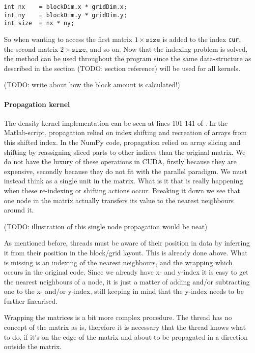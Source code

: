\begin{verbatim}
int nx    = blockDim.x * gridDim.x;
int ny    = blockDim.y * gridDim.y;
int size  = nx * ny;
\end{verbatim}

So when wanting to access the first matrix $1 \times \mathrm{\texttt{size}}$ is added to the index \texttt{cur}, the second matrix $2 \times \mathrm{\texttt{size}}$, and so on. Now that the indexing problem is solved, the method can be used throughout the program since the same data-structure as described in the section (TODO: section reference) will be used for all kernels.

(TODO: write about how the block amount is calculated!)


\paragraph{Propagation kernel} The density kernel implementation can be seen at lines 101-141 of . In the Matlab-script, propagation relied on index shifting and recreation of arrays from this shifted index. In the NumPy code, propagation relied on array slicing and shifting by reassigning sliced parts to other indices than the original matrix. We do not have the luxury of these operations in CUDA, firstly because they are expensive, secondly because they do not fit with the parallel paradigm. We must instead think as a single unit in the matrix. What is it that is really happening when these re-indexing or shifting actions occur. Breaking it down we see that one node in the matrix actually transfers its value to the nearest neighbours around it.

(TODO: illustration of this single node propagation would be neat)

As mentioned before, threads must be aware of their position in data by inferring it from their position in the block/grid layout. This is already done above. What is missing is an indexing of the nearest neighbours, and the wrapping which occurs in the original code. Since we already have x- and y-index it is easy to get the nearest neighbours of a node, it is just a matter of adding and/or subtracting one to the x- and/or y-index, still keeping in mind that the y-index needs to be further linearised.

Wrapping the matrices is a bit more complex procedure. The thread has no concept of the matrix as is, therefore it is necessary that the thread knows what to do, if it's on the edge of the matrix and about to be propagated in a direction outside the matrix.

